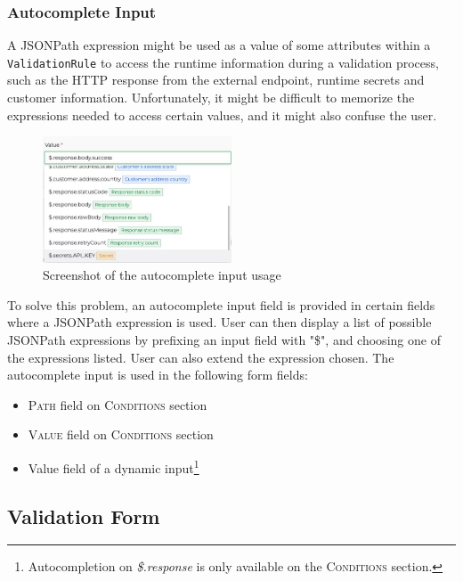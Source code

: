     \newpage
    \subsubsection{Autocomplete Input}

      A JSONPath expression might be used as a value of some attributes within a \verb;ValidationRule; to access the runtime information during a validation process, such as the HTTP response from the external endpoint, runtime secrets and customer information. Unfortunately, it might be difficult to memorize the expressions needed to access certain values, and it might also confuse the user. 

      \begin{figure}[!ht]
        \centering
        \includegraphics[width=0.5\textwidth]{images/ss_autocomplete.jpeg}
        \caption{Screenshot of the autocomplete input usage}
      \end{figure}

      To solve this problem, an autocomplete input field is provided in certain fields where a JSONPath expression is used. User can then display a list of possible JSONPath expressions by prefixing an input field with "\$", and choosing one of the expressions listed. User can also extend the expression chosen. The autocomplete input is used in the following form fields:

      \begin{itemize}
        \item \textsc{Path} field on \textsc{Conditions} section
        \item \textsc{Value} field on \textsc{Conditions} section
        \item Value field of a dynamic input\footnote{Autocompletion on \emph{\$.response} is only available on the \textsc{Conditions} section.}
      \end{itemize}

  \subsection{Validation Form}

